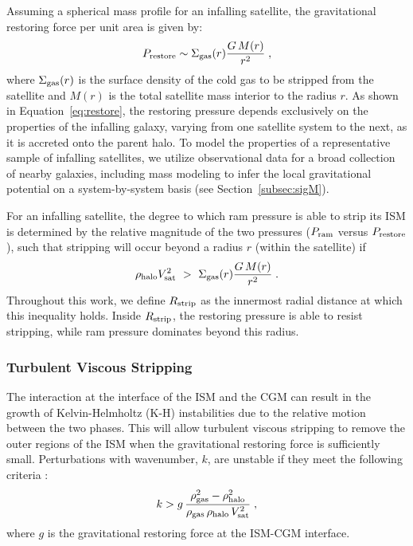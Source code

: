\documentclass[usenatbib]{mn2e}
\newcommand{\gt}{>}
\begin{document}
Assuming a spherical mass profile for an infalling satellite, the
gravitational restoring force per unit area is given by:
%
\begin{equation}
P_{\rm restore} \sim \Sigma_{\rm gas}(r) \frac{G \, M(r)}{r^2}
\; ,
\label{eq:restore}
\end{equation}
%
where $\Sigma_{\rm gas}(r)$ is the surface density of the cold gas to
be stripped from the satellite and $M(r)$ is the total satellite mass
interior to the radius $r$.
%
As shown in Equation~\ref{eq:restore}, the restoring pressure depends
exclusively on the properties of the infalling galaxy, varying from
one satellite system to the next, as it is accreted onto the parent
halo.
%
To model the properties of a representative sample of infalling
satellites, we utilize observational data for a broad collection of
nearby galaxies, including mass modeling to infer the local
gravitational potential on a system-by-system basis (see
Section~\ref{subsec:sigM}).
%

For an infalling satellite, the degree to which ram pressure is able
to strip its ISM is determined by the relative magnitude of the two
pressures ($P_{\rm ram}$ versus $P_{\rm restore}$), such that
stripping will occur beyond a radius $r$ (within the satellite) if
%
\begin{equation}
\rho_{\rm halo} V_{\rm sat}^{2} \ \gt \ \Sigma_{\rm gas}(r)
\frac{G \, M(r)}{r^2}  \; .
\label{eq:test}
\end{equation}
%
Throughout this work, we define $R_{\rm strip}$ as the innermost
radial distance at which this inequality holds. 
%
Inside $R_{\rm strip}$, the restoring pressure is able to resist
stripping, while ram pressure dominates beyond this radius.

\subsubsection{Turbulent Viscous Stripping}

The interaction at the interface of the ISM and the CGM can result in
the growth of Kelvin-Helmholtz (K-H) instabilities due to the relative
motion between the two phases. 
This will allow turbulent viscous stripping to remove the outer
regions of the ISM when the gravitational restoring force is
sufficiently small. Perturbations with wavenumber, $k$, are unstable
if they meet the following criteria \citep{murray93, mori00}:
%
\begin{equation}
k \gt g \, \frac{\rho_{\rm gas}^{2} - \rho_{\rm halo}^{2}}{\rho_{\rm gas}
  \, \rho_{\rm halo} \, V_{\rm sat}^{2}} \; ,
\label{eq:k}
\end{equation}
%
where $g$ is the gravitational restoring force at the ISM-CGM
interface. 
\end{document}
